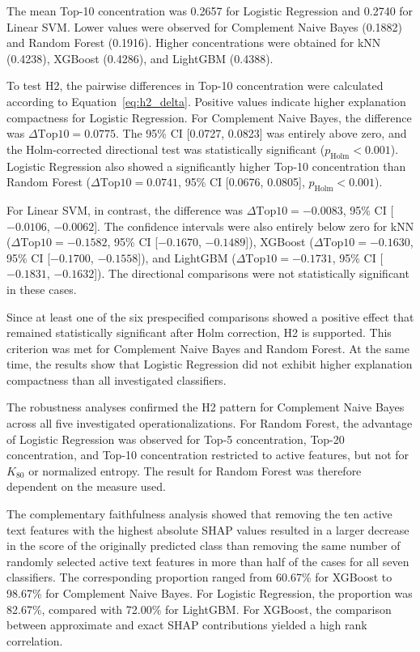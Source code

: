The mean Top-10 concentration was 0.2657 for Logistic Regression and 0.2740
for Linear SVM. Lower values were observed for Complement Naive Bayes
(0.1882) and Random Forest (0.1916). Higher concentrations were obtained for
kNN (0.4238), XGBoost (0.4286), and LightGBM (0.4388).

To test H2, the pairwise differences in Top-10 concentration were calculated
according to Equation~\ref{eq:h2_delta}. Positive values indicate higher
explanation compactness for Logistic Regression. For Complement Naive Bayes,
the difference was $\Delta \mathrm{Top10} = 0.0775$. The 95\% CI
[0.0727, 0.0823] was entirely above zero, and the Holm-corrected directional
test was statistically significant ($p_{\mathrm{Holm}} < 0.001$). Logistic
Regression also showed a significantly higher Top-10 concentration than
Random Forest ($\Delta \mathrm{Top10} = 0.0741$, 95\% CI
[0.0676, 0.0805], $p_{\mathrm{Holm}} < 0.001$).

For Linear SVM, in contrast, the difference was
$\Delta \mathrm{Top10} = -0.0083$, 95\% CI
[$-0.0106$, $-0.0062$]. The confidence intervals were also entirely below
zero for kNN ($\Delta \mathrm{Top10} = -0.1582$, 95\% CI
[$-0.1670$, $-0.1489$]), XGBoost
($\Delta \mathrm{Top10} = -0.1630$, 95\% CI
[$-0.1700$, $-0.1558$]), and LightGBM
($\Delta \mathrm{Top10} = -0.1731$, 95\% CI
[$-0.1831$, $-0.1632$]). The directional comparisons were not statistically
significant in these cases.

Since at least one of the six prespecified comparisons showed a positive
effect that remained statistically significant after Holm correction, H2 is
supported. This criterion was met for Complement Naive Bayes and Random
Forest. At the same time, the results show that Logistic Regression did not
exhibit higher explanation compactness than all investigated classifiers.

The robustness analyses confirmed the H2 pattern for Complement Naive Bayes
across all five investigated operationalizations. For Random Forest, the
advantage of Logistic Regression was observed for Top-5 concentration,
Top-20 concentration, and Top-10 concentration restricted to active features,
but not for \(K_{80}\) or normalized entropy. The result for Random Forest was
therefore dependent on the measure used.

The complementary faithfulness analysis showed that removing the ten active
text features with the highest absolute SHAP values resulted in a larger
decrease in the score of the originally predicted class than removing the same
number of randomly selected active text features in more than half of the
cases for all seven classifiers. The corresponding proportion ranged from
60.67\% for XGBoost to 98.67\% for Complement Naive Bayes. For Logistic
Regression, the proportion was 82.67\%, compared with 72.00\% for LightGBM.
For XGBoost, the comparison between approximate and exact SHAP contributions
yielded a high rank correlation.

